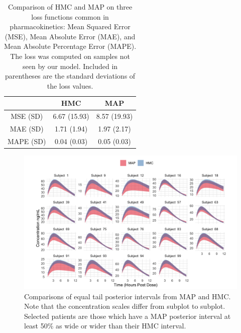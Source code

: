 \begin{table}
	\centering
\begin{tabular}{|c|c|c|}
	\hline 
	& HMC & MAP \\ 
	\hline 
	MSE (SD) & 6.67 (15.93) & 8.57 (19.93) \\ 
	\hline 
	MAE (SD) & 1.71 (1.94) & 1.97 (2.17) \\ 
	\hline 
	MAPE (SD) & 0.04 (0.03) & 0.05 (0.03)\\ 
	\hline 
\end{tabular} 
\caption{Comparison of HMC and MAP on three loss functions common in pharmacokinetics:  Mean Squared Error (MSE), Mean Absolute Error (MAE), and Mean Absolute Percentage Error (MAPE).  The loss was computed on samples not seen by our model.  Included in parentheses are the standard deviations of the loss values.}
\label{table2}
\end{table}

\clearpage
\begin{figure}
\centering
	\includegraphics[width=1\linewidth]{figs/intervals}
	\caption{Comparisons of equal tail posterior intervals from MAP and HMC. Note that the concentration scales differ from subplot to subplot.  Selected patients are those which have a MAP posterior interval at least 50\% as wide or wider than their HMC interval.}
	\label{fig:fig6}
\end{figure}
\clearpage

